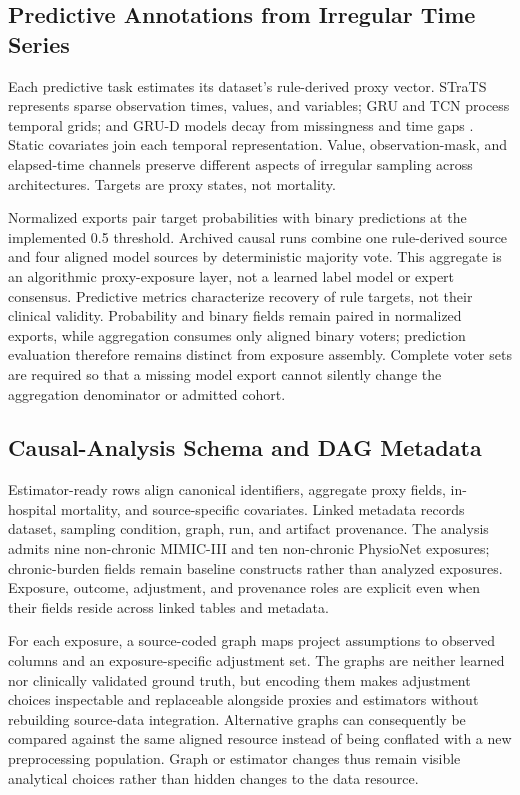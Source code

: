 \documentclass[letterpaper]{article}
\begin{document}
\subsection{Predictive Annotations from Irregular Time Series}

Each predictive task estimates its dataset's rule-derived proxy vector. STraTS
represents sparse observation times, values, and variables; GRU and TCN process
temporal grids; and GRU-D models decay from missingness and time gaps
\cite{tipirneni2022strats,cho2014gru,bai2018tcn,che2018grud}. Static covariates
join each temporal representation. Value, observation-mask, and elapsed-time
channels preserve different aspects of irregular sampling across architectures.
Targets are proxy states, not mortality.

Normalized exports pair target probabilities with binary predictions at the
implemented 0.5 threshold. Archived causal runs combine one rule-derived source
and four aligned model sources by deterministic majority vote. This aggregate
is an algorithmic proxy-exposure layer, not a learned label model or expert
consensus. Predictive metrics characterize recovery of rule targets, not their
clinical validity. Probability and binary fields remain paired in normalized
exports, while aggregation consumes only aligned binary voters; prediction
evaluation therefore remains distinct from exposure assembly. Complete voter
sets are required so that a missing model export cannot silently change the
aggregation denominator or admitted cohort.

\subsection{Causal-Analysis Schema and DAG Metadata}

Estimator-ready rows align canonical identifiers, aggregate proxy fields,
in-hospital mortality, and source-specific covariates. Linked metadata records
dataset, sampling condition, graph, run, and artifact provenance. The analysis
admits nine non-chronic MIMIC-III and ten non-chronic PhysioNet exposures;
chronic-burden fields remain baseline constructs rather than analyzed
exposures. Exposure, outcome, adjustment, and provenance roles are explicit even
when their fields reside across linked tables and metadata.

For each exposure, a source-coded graph maps project assumptions to observed
columns and an exposure-specific adjustment set. The graphs are neither learned
nor clinically validated ground truth, but encoding them makes adjustment
choices inspectable and replaceable alongside proxies and estimators without
rebuilding source-data integration. Alternative graphs can consequently be
compared against the same aligned resource instead of being conflated with a
new preprocessing population. Graph or estimator changes thus remain visible
analytical choices rather than hidden changes to the data resource.
\end{document}
